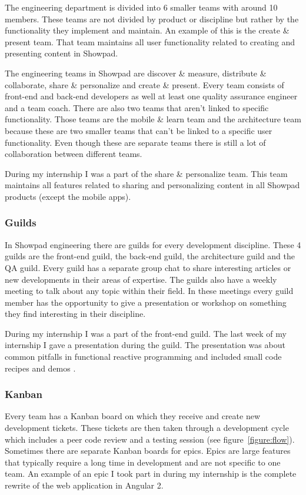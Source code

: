 The engineering department is divided into 6 smaller teams with around 10 members. These teams are not divided by product or discipline but rather by the functionality they implement and maintain. An example of this is the create \& present team. That team maintains all user functionality related to creating and presenting content in Showpad.

The engineering teams in Showpad are discover \& measure, distribute \& collaborate, share \& personalize and create \& present. Every team consists of front-end and back-end developers as well at least one quality assurance engineer and a team coach. There are also two teams that aren't linked to specific functionality. Those teams are the mobile \& learn team and the architecture team because these are two smaller teams that can't be linked to a specific user functionality. Even though these are separate teams there is still a lot of collaboration between different teams.

During my internship I was a part of the share \& personalize team. This team maintains all features related to sharing and personalizing content in all Showpad products (except the mobile apps).


\subsubsection{Guilds}

In Showpad engineering there are guilds for every development discipline. These 4 guilds are the front-end guild, the back-end guild, the architecture guild and the QA guild. Every guild has a separate group chat to share interesting articles or new developments in their areas of expertise. The guilds also have a weekly meeting to talk about any topic within their field. In these meetings every guild member has the opportunity to give a presentation or workshop on something they find interesting in their discipline.

During my internship I was a part of the front-end guild. The last week of my internship I gave a presentation during the guild. The presentation was about common pitfalls in functional reactive programming and included small code recipes and demos \cite{slides}.

\subsubsection{Kanban}

Every team has a Kanban board \cite{kanban} on which they receive and create new development tickets. These tickets are then taken through a development cycle which includes a peer code review and a testing session (see figure~\ref{figure:flow}). Sometimes there are separate Kanban boards for epics. Epics are large features that typically require a long time in development and are not specific to one team. An example of an epic I took part in during my internship is the complete rewrite of the web application in Angular 2.

